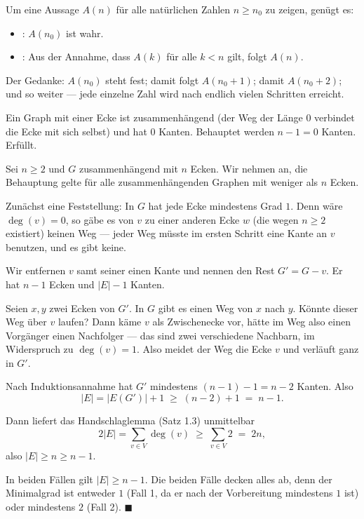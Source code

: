 \begin{merksatz}
Um eine Aussage $A(n)$ für alle natürlichen Zahlen $n \ge n_0$ zu zeigen, genügt es:
\begin{itemize}[leftmargin=1.4em, itemsep=2pt]
\item {}: $A(n_0)$ ist wahr.
\item {}: Aus der Annahme, dass $A(k)$ für alle $k < n$ gilt, folgt $A(n)$.
\end{itemize}
Der Gedanke: $A(n_0)$ steht fest; damit folgt $A(n_0+1)$; damit $A(n_0+2)$; und so weiter --- jede einzelne Zahl wird nach endlich vielen Schritten erreicht.

Ein Graph mit einer Ecke ist zusammenhängend (der Weg der Länge $0$ verbindet die Ecke mit sich selbst) und hat $0$ Kanten. Behauptet werden $n - 1 = 0$ Kanten. Erfüllt.

Sei $n \ge 2$ und $G$ zusammenhängend mit $n$ Ecken. Wir nehmen an, die Behauptung gelte für alle zusammenhängenden Graphen mit weniger als $n$ Ecken.

Zunächst eine Feststellung: In $G$ hat jede Ecke mindestens Grad $1$. Denn wäre $\deg(v) = 0$, so gäbe es von $v$ zu einer anderen Ecke $w$ (die wegen $n \ge 2$ existiert) keinen Weg --- jeder Weg müsste im ersten Schritt eine Kante an $v$ benutzen, und es gibt keine.

Wir entfernen $v$ samt seiner einen Kante und nennen den Rest $G' = G - v$. Er hat $n-1$ Ecken und $|E| - 1$ Kanten.

 Seien $x, y$ zwei Ecken von $G'$. In $G$ gibt es einen Weg von $x$ nach $y$. Könnte dieser Weg über $v$ laufen? Dann käme $v$ als Zwischenecke vor, hätte im Weg also einen Vorgänger  einen Nachfolger --- das sind zwei verschiedene Nachbarn, im Widerspruch zu $\deg(v) = 1$. Also meidet der Weg die Ecke $v$ und verläuft ganz in $G'$.

Nach Induktionsannahme hat $G'$ mindestens $(n-1) - 1 = n-2$ Kanten. Also
\[ |E| = |E(G')| + 1 \;\ge\; (n-2) + 1 \;=\; n-1 . \]

Dann liefert das Handschlaglemma (Satz 1.3) unmittelbar
\[ 2|E| = \sum_{v \in V} \deg(v) \;\ge\; \sum_{v \in V} 2 \;=\; 2n, \]
also $|E| \ge n \ge n-1$.

In beiden Fällen gilt $|E| \ge n-1$. Die beiden Fälle decken alles ab, denn der Minimalgrad ist entweder $1$ (Fall 1, da er nach der Vorbereitung mindestens $1$ ist) oder mindestens $2$ (Fall 2). $\blacksquare$
\end{merksatz}

